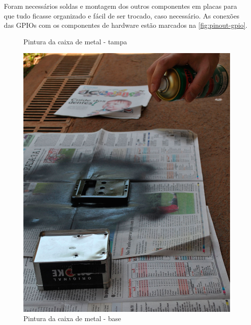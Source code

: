 \documentclass[
		12pt,				%
		openright,			%
		oneside,			%
		a4paper,			%
		chapter=TITLE,		%
		english,			%
		brazil				%
	]{abntex2}
\begin{document}
Foram necessários soldas e montagem dos outros componentes em placas para que tudo ficasse organizado e fácil de ser trocado, caso necessário. As conexões das GPIOs com os componentes de hardware estão marcados na \autoref{fig:pinout-gpio}.

\begin{figure}[htb]
	\centering
 	\begin{minipage}{0.45\textwidth}
		\centering
		\caption{\label{fig:pintar-1}Pintura da caixa de metal - tampa}
		\includegraphics[width=1\textwidth]{img/pintar-1.jpg}
	\end{minipage}
	\hfill
	\begin{minipage}{0.45\textwidth}
		\centering
		\caption{\label{fig:pintar-2}Pintura da caixa de metal - base}

\end{minipage}
\end{figure}
\end{document}
